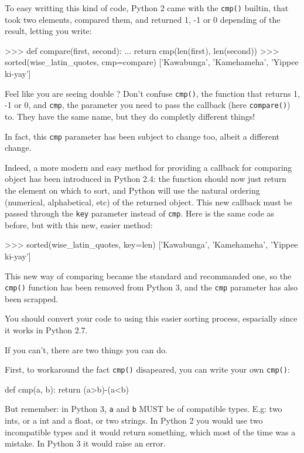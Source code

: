 To easy writting this kind of code, Python 2 came with the \lstinline{cmp()} \gls{builtin}, that took two elements, compared them, and returned 1, -1 or 0 depending of the result, letting you write:

\begin{py2}
>>> def compare(first, second):
...     return cmp(len(first), len(second))
>>> sorted(wise_latin_quotes, cmp=compare)
['Kawabunga', 'Kamehameha', 'Yippee ki-yay']
\end{py2}

Feel like you are seeing double ? Don't confuse \lstinline{cmp()}, the function that returns 1, -1 or 0, and \lstinline{cmp}, the parameter you need to pass the callback (here \lstinline{compare()}) to. They have the same name, but they do completly different things!

In fact, this \lstinline{cmp} parameter has been subject to change too, albeit a different change.

Indeed, a more modern and easy method for providing a callback for comparing object has been introduced in Python 2.4: the function should now just return the element on which to sort, and Python will use the natural ordering (numerical, alphabetical, etc) of the returned object. This new callback must be passed through the \lstinline{key} parameter instead of \lstinline{cmp}. Here is the same code as before, but with this new, easier method:

\begin{py2and3}
>>> sorted(wise_latin_quotes, key=len)
['Kawabunga', 'Kamehameha', 'Yippee ki-yay']
\end{py2and3}

This new way of comparing became the standard and recommanded one, so the \lstinline{cmp()} function has been removed from Python 3, and the \lstinline{cmp} parameter has also been scrapped.

You should convert your code to using this easier sorting process, espacially since it works in Python 2.7.

If you can't, there are two things you can do.

First, to workaround the fact \lstinline{cmp()} disapeared, you can write your own \lstinline{cmp()}:

\begin{py2and3}
def cmp(a, b):
    return (a>b)-(a<b)
\end{py2and3}

But remember: in Python 3, \lstinline{a} and \lstinline{b} MUST be of compatible types. E.g: two ints, or a int and a float, or two strings. In Python 2 you would use two incompatible types and it would return something, which most of the time was a mistake. In Python 3 it would raise an error.

